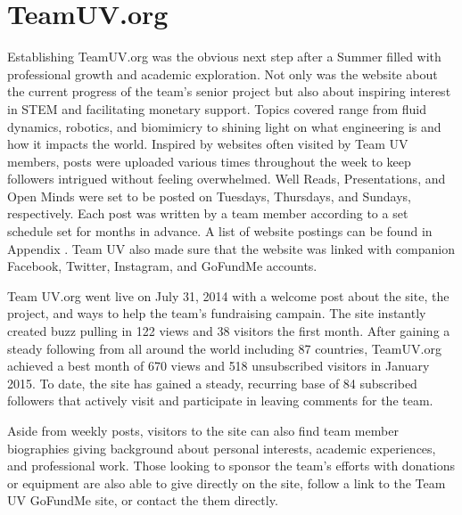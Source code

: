 \documentclass{report}
\begin{document}
\section{TeamUV.org}
Establishing TeamUV.org was the obvious next step after a Summer filled with professional growth and academic exploration.  Not only was the website about the current progress of the team’s senior project but also about inspiring interest in STEM and facilitating monetary support.  Topics covered range from fluid dynamics, robotics, and biomimicry to shining light on what engineering is and how it impacts the world.  Inspired by websites often visited by Team UV members, posts were uploaded various times throughout the week to keep followers intrigued without feeling overwhelmed.  Well Reads, Presentations, and Open Minds were set to be posted on Tuesdays, Thursdays, and Sundays, respectively.  Each post was written by a team member according to a set schedule set for months in advance.  A list of website postings can be found in Appendix .  Team UV also made sure that the website was linked with companion Facebook, Twitter, Instagram, and GoFundMe accounts.\par
\indent Team UV.org went live on July 31, 2014 with a welcome post about the site, the project, and ways to help the team’s fundraising campain.  The site instantly created buzz pulling in 122 views and 38 visitors the first month.  After gaining a steady following from all around the world including 87 countries, TeamUV.org achieved a best month of 670 views and 518 unsubscribed visitors in January 2015.  To date, the site has gained a steady, recurring base of 84 subscribed followers that actively visit and participate in leaving comments for the team.\par
\indent Aside from weekly posts, visitors to the site can also find team member biographies giving background about personal interests, academic experiences, and professional work.  Those looking to sponsor the team’s efforts with donations or equipment are also able to give directly on the site, follow a  link to the Team UV GoFundMe site, or contact the them directly.  
\end{document}
